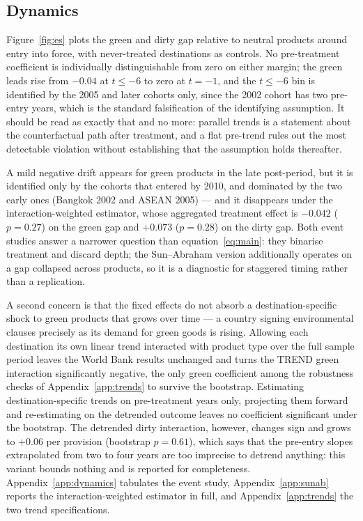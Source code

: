 \documentclass[12pt]{article}
\begin{document}


\FloatBarrier
\subsection{Dynamics}\label{sec:dynamics}

Figure~\ref{fig:es} plots the green and dirty gap relative to neutral products around entry into
force, with never-treated destinations as controls. No pre-treatment coefficient is individually distinguishable from zero on either margin; the green leads rise from $-0.04$ at $t \le -6$ to zero at $t=-1$, and the $t \le -6$ bin is identified by the 2005 and later cohorts only, since the 2002 cohort has two pre-entry years, which is the standard falsification of the identifying assumption. It should be read as
exactly that and no more: parallel trends is a statement about the counterfactual path after
treatment, and a flat pre-trend rules out the most detectable violation without establishing that
the assumption holds thereafter.

A mild negative drift appears for green products in the late post-period, but it is identified only
by the cohorts that entered by 2010, and dominated by the two early ones (Bangkok 2002 and ASEAN
2005) --- and it disappears under the \citet{sun2021} interaction-weighted estimator, whose aggregated
treatment effect is $-0.042$ ($p = 0.27$) on the green gap and $+0.073$ ($p = 0.28$) on the dirty
gap. Both event studies answer a narrower question than equation~\eqref{eq:main}: they binarise
treatment and discard depth; the Sun--Abraham version additionally operates on a gap collapsed across products,
so it is a diagnostic for staggered timing rather than a replication.

A second concern is that the fixed effects do not absorb a destination-specific shock to green
products that grows over time --- a country signing environmental clauses precisely as its demand for
green goods is rising. Allowing each destination its own linear trend interacted with product type
over the full sample period leaves the World Bank results unchanged and turns the TREND green
interaction significantly negative, the only green coefficient among the robustness checks of Appendix~\ref{app:trends}
to survive the bootstrap. Estimating destination-specific trends on pre-treatment years only, projecting them
forward and re-estimating on the detrended outcome leaves no coefficient significant under the bootstrap. The
detrended dirty interaction, however, changes sign and grows to $+0.06$ per provision (bootstrap
$p = 0.61$), which says that the pre-entry slopes extrapolated from two to four years are too
imprecise to detrend anything: this variant bounds nothing and is reported for completeness.
Appendix~\ref{app:dynamics} tabulates the event study, Appendix~\ref{app:sunab} reports the
interaction-weighted estimator in full, and Appendix~\ref{app:trends} the two trend specifications.
\end{document}
